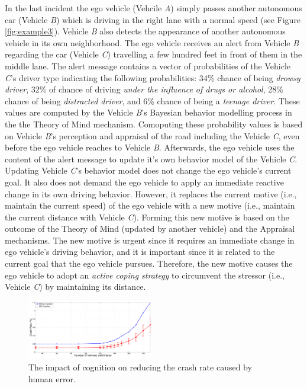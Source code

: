 \documentclass[journal, 11pt]{IEEEtran}
\begin{document}
In the last incident the ego vehicle (Vehcile \textit{A}) simply passes another
autonomous car (Vehicle \textit{B}) which is driving in the right lane with a
normal speed (see Figure \ref{fig:example3}). Vehicle \textit{B} also detects
the appearance of another autonomous vehicle in its own neighborhood. The ego
vehicle receives an alert from Vehicle \textit{B} regarding the car (Vehicle
\textit{C}) travelling a few hundred feet in front of them in the middle lane.
The alert message contains a vector of probabilities of the Vehicle \textit{C}'s
driver type indicating the following probabilities: 34\% chance of being
\textit{drowsy driver}, 32\% of chance of driving \textit{under the influence of
drugs or alcohol}, 28\% chance of being \textit{distracted driver}, and 6\%
chance of being a \textit{teenage driver}. These values are computed by the
Vehicle \textit{B}'s Bayesian behavior modelling process in the the Theory of
Mind mechanism. Comoputing these probability values is based on Vehicle
\textit{B}'s perception and appraisal of the road including the Vehicle
\textit{C}, even before the ego vehicle reaches to Vehicle \textit{B}.
Afterwards, the ego vehicle uses the content of the alert message to update it's
own behavior model of the Vehicle \textit{C}. Updating Vehicle \textit{C}'s
behavior model does not change the ego vehicle's current goal. It also does not
demand the ego vehicle to apply an immediate reactive change in its own driving
behavior. However, it replaces the current motive (i.e., maintain the current
speed) of the ego vehicle with a new motive (i.e., maintain the current distance
with Vehicle \textit{C}). Forming this new motive is based on the outcome of the
Theory of Mind (updated by another vehicle) and the Appraisal mechanisms. The
new motive is urgent since it requires an immediate change in ego vehicle's
driving behavior, and it is important since it is related to the current goal
that the ego vehicle pursues. Therefore, the new motive causes the ego vehicle
to adopt an \textit{active coping strategy} to circumvent the stressor (i.e.,
Vehicle \textit{C}) by maintaining its distance.

\begin{figure}[!t]
  \centering
  \includegraphics[width=0.49\textwidth]{figs/errorPlot.pdf}
  \caption{{\fontsize{10}{10}\selectfont The impact of cognition on reducing the
  crash rate caused by human error.}}
  \label{fig:errorPlot}
  \vspace*{-6mm}
\end{figure}
\end{document}
